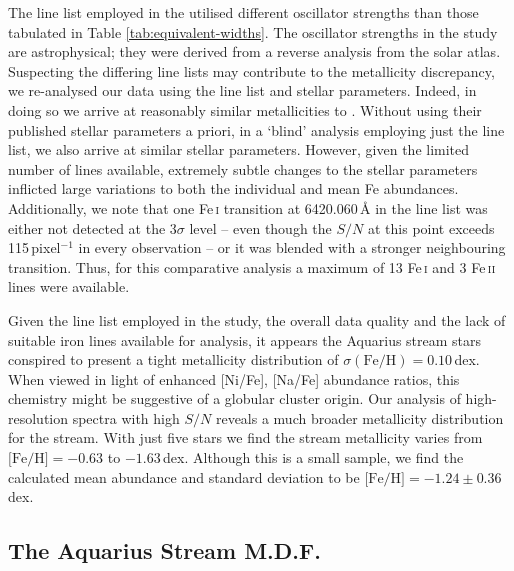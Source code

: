 \documentclass{emulateapj}
\begin{document}
The line list employed in the \citet{wylie-de-boer;et-al_2012} utilised different oscillator strengths than those tabulated in Table \ref{tab:equivalent-widths}. The oscillator strengths in the \citet{wylie-de-boer;et-al_2012} study are astrophysical; they were derived from a reverse analysis from the \citet{hinkle;et-al_2003} solar atlas. Suspecting the differing line lists may contribute to the metallicity discrepancy, we re-analysed our data using the \citet{wylie-de-boer;et-al_2012} line list and stellar parameters. Indeed, in doing so we arrive at reasonably similar metallicities to \citet{wylie-de-boer;et-al_2012}. Without using their published stellar parameters a priori, in a `blind' analysis employing just the \citet{wylie-de-boer;et-al_2012} line list, we also arrive at similar stellar parameters. However, given the limited number of lines available, extremely subtle changes to the stellar parameters inflicted large variations to both the individual and mean Fe abundances. Additionally, we note that one {Fe\,\textsc{i}} transition at {6420.060\,\AA} in the \citet{wylie-de-boer;et-al_2012} line list was either not detected at the {3$\sigma$} level -- even though the $S/N$ at this point exceeds {115\,pixel$^{-1}$} in every observation -- or it was blended with a stronger neighbouring transition. Thus, for this comparative analysis a maximum of 13 {Fe\,\textsc{i}} and 3 {Fe\,\textsc{ii}} lines were available.

Given the line list employed in the \citet{wylie-de-boer;et-al_2012} study, the overall data quality and the lack of suitable iron lines available for analysis, it appears the Aquarius stream stars conspired to present a tight metallicity distribution of {$\sigma(\mbox{Fe/H}) = 0.10$\,dex}. When viewed in light of enhanced [Ni/Fe], [Na/Fe] abundance ratios, this chemistry might be suggestive of a globular cluster origin. Our analysis of high-resolution spectra with high $S/N$ reveals a much broader metallicity distribution for the stream. With just five stars we find the stream metallicity varies from {$\mbox{[Fe/H]} = -0.63$} to {$-1.63$\,dex}. Although this is a small sample, we find the calculated mean abundance and standard deviation to be {$\mbox{[Fe/H]} = -1.24 \pm 0.36$\,dex}.


\subsection{The Aquarius Stream M.D.F.}
\end{document}
